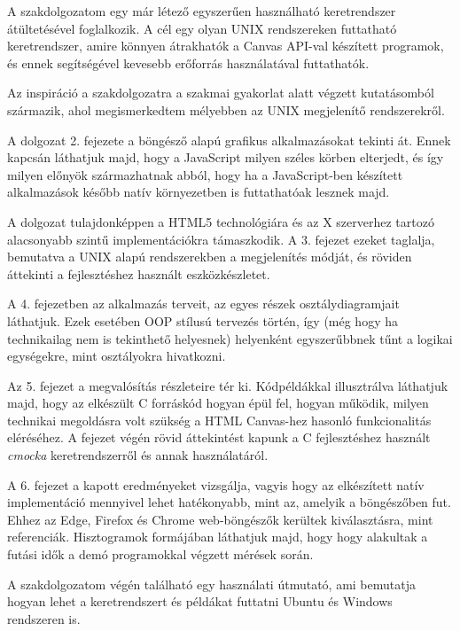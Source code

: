 
 A szakdolgozatom egy már létező egyszerűen használható keretrendszer átültetésével foglalkozik. A cél egy olyan UNIX rendszereken futtatható keretrendszer, amire könnyen átrakhatók a Canvas API-val készített programok, és ennek segítségével kevesebb erőforrás használatával futtathatók.
 
 Az inspiráció a szakdolgozatra a szakmai gyakorlat alatt végzett kutatásomból származik, ahol megismerkedtem mélyebben az UNIX megjelenítő rendszerekről.
 
 A dolgozat 2. fejezete a böngésző alapú grafikus alkalmazásokat tekinti át. Ennek kapcsán láthatjuk majd, hogy a JavaScript milyen széles körben elterjedt, és így milyen előnyök származhatnak abból, hogy ha a JavaScript-ben készített alkalmazások később natív környezetben is futtathatóak lesznek majd.
 
 A dolgozat tulajdonképpen a HTML5 technológiára és az X szerverhez tartozó alacsonyabb szintű implementációkra támaszkodik. A 3. fejezet ezeket taglalja, bemutatva a UNIX alapú rendszerekben a megjelenítés módját, és röviden áttekinti a fejlesztéshez használt eszközkészletet.
 
 A 4. fejezetben az alkalmazás terveit, az egyes részek osztálydiagramjait láthatjuk. Ezek esetében OOP stílusú tervezés történ, így (még hogy ha technikailag nem is tekinthető helyesnek) helyenként egyszerűbbnek tűnt a logikai egységekre, mint osztályokra hivatkozni.
 
 Az 5. fejezet a megvalósítás részleteire tér ki. Kódpéldákkal illusztrálva láthatjuk majd, hogy az elkészült C forráskód hogyan épül fel, hogyan működik, milyen technikai megoldásra volt szükség a HTML Canvas-hez hasonló funkcionalitás eléréséhez. A fejezet végén rövid áttekintést kapunk a C fejlesztéshez használt \textit{cmocka} keretrendszerről és annak használatáról.
 
 A 6. fejezet a kapott eredményeket vizsgálja, vagyis hogy az elkészített natív implementáció mennyivel lehet hatékonyabb, mint az, amelyik a böngészőben fut. Ehhez az Edge, Firefox és Chrome web-böngészők kerültek kiválasztásra, mint referenciák. Hisztogramok formájában láthatjuk majd, hogy hogy alakultak a futási idők a demó programokkal végzett mérések során.

 A szakdolgozatom végén található egy használati útmutató, ami bemutatja hogyan lehet a keretrendszert  és példákat futtatni Ubuntu és Windows rendszeren is.